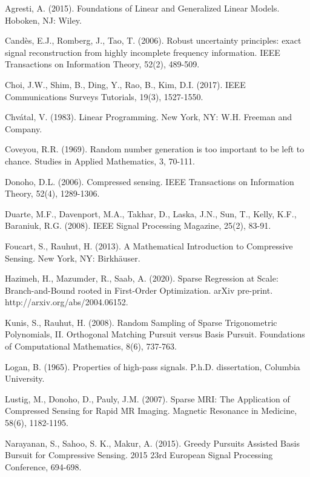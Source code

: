 \documentclass[12pt,a4paper]{amsart}
\numberwithin{equation}{section}
\theoremstyle{plain}
\theoremstyle{definition}
\begin{document}
\begin{thebibliography}{99} 

 Agresti, A. (2015). Foundations of Linear and Generalized Linear Models. Hoboken, NJ: Wiley. 

 Cand\`{e}s, E.J., Romberg, J., Tao, T. (2006). Robust uncertainty principles: exact signal reconstruction from highly incomplete frequency information. IEEE Transactions on Information Theory, 52(2), 489-509.

 Choi, J.W., Shim, B., Ding, Y., Rao, B., Kim, D.I. (2017). IEEE Communications Surveys Tutorials, 19(3), 1527-1550.

 Chv\'{a}tal, V. (1983). Linear Programming. New York, NY: W.H. Freeman and Company.

 Coveyou, R.R. (1969). Random number generation is too important to be left to chance. Studies in Applied Mathematics, 3, 70-111.

 Donoho, D.L. (2006). Compressed sensing. IEEE Transactions on Information Theory, 52(4), 1289-1306.

 Duarte, M.F., Davenport, M.A., Takhar, D., Laska, J.N., Sun, T., Kelly, K.F., Baraniuk, R.G. (2008). IEEE Signal Processing Magazine, 25(2), 83-91.

 Foucart, S., Rauhut, H. (2013). A Mathematical Introduction to Compressive Sensing. New York, NY: Birkh{\"a}user. 

 Hazimeh, H., Mazumder, R., Saab, A. (2020). Sparse Regression at Scale: Branch-and-Bound rooted in First-Order Optimization. arXiv pre-print. http://arxiv.org/abs/2004.06152.

 Kunis, S., Rauhut, H. (2008). Random Sampling of Sparse Trigonometric Polynomials, II. Orthogonal Matching Pursuit versus Basis Pursuit. Foundations of Computational Mathematics, 8(6), 737-763.

 Logan, B. (1965). Properties of high-pass signals. P.h.D. dissertation, Columbia University.

 Lustig, M., Donoho, D., Pauly, J.M. (2007). Sparse MRI: The Application of Compressed Sensing for Rapid MR Imaging. Magnetic Resonance in Medicine, 58(6), 1182-1195.

 Narayanan, S., Sahoo, S. K., Makur, A. (2015). Greedy Pursuits Assisted Basis Bursuit for Compressive Sensing. 2015 23rd European Signal Processing Conference, 694-698.


\end{thebibliography}
\end{document}
